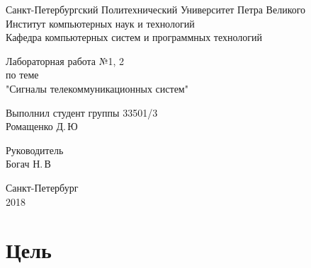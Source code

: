 \documentclass[12pt,a4paper]{scrartcl}
\begin{document}
\begin{titlepage}
  \begin{center}
    Санкт-Петербургский Политехнический Университет     Петра Великого \\
    
    Институт компьютерных наук и технологий \\
    
    Кафедра компьютерных систем и программных технологий
  \end{center}
  
  \vfill
  
  \begin{center}
  Лабораторная работа №1, 2\\
  по теме\\
  "Сигналы телекоммуникационных
систем"\\
\end{center}

\vfill

\newlength{\ML}
\hfill\begin{minipage}{0.4\textwidth}
  Выполнил студент группы 33501/3\\
  \underline{\hspace{\ML}} Ромащенко Д.\,Ю\\
\end{minipage}%

\bigskip

\hfill\begin{minipage}{0.4\textwidth}
  Руководитель\\
  \underline{\hspace{\ML}} Богач Н.\,В\\
\end{minipage}%

\vfill
 
\begin{center}
  Санкт-Петербург\\
2018 
\end{center}

\end{titlepage}

\section{Цель}
\label{sec:goal}
\end{document}
